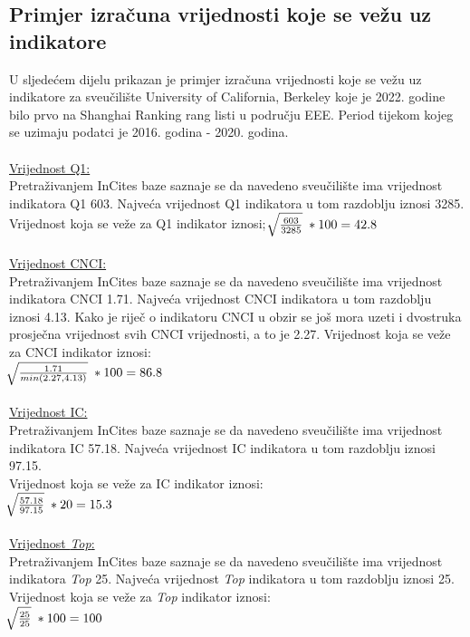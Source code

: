 \documentclass[times, utf8, zavrsni]{fer}
\begin{document}
\subsection{Primjer izračuna vrijednosti koje se vežu uz indikatore}
\label{racunanje}
U sljedećem dijelu prikazan je primjer izračuna vrijednosti koje se vežu uz indikatore za sveučilište University of California, Berkeley koje je 2022. godine bilo prvo na 
Shanghai Ranking rang listi u području EEE.
Period tijekom kojeg se uzimaju podatci je 2016. godina - 2020. godina.
\\
\\ \underline{Vrijednost Q1:} 
\\ Pretraživanjem InCites baze saznaje se da navedeno sveučilište ima vrijednost indikatora Q1 603. Najveća vrijednost Q1 indikatora u tom razdoblju iznosi 3285.
Vrijednost koja se veže za Q1 indikator iznosi;  \; $\sqrt[\leftroot{-2}]{\frac{603}{3285}} \; * 100 = 42.8$
\\
\\ \underline{Vrijednost CNCI:} 
\\ Pretraživanjem InCites baze saznaje se da navedeno sveučilište ima vrijednost indikatora CNCI 1.71. Najveća vrijednost CNCI indikatora u tom razdoblju iznosi 4.13.
Kako je riječ o indikatoru CNCI u obzir se još mora uzeti i dvostruka prosječna vrijednost svih CNCI vrijednosti, a to je 2.27.
Vrijednost koja se veže za CNCI indikator iznosi: \; \\ $\sqrt[\leftroot{-2}]{\frac{1.71}{min(2.27, 4.13)}} \; * 100 = 86.8$
\\
\\ \underline{Vrijednost IC:} 
\\ Pretraživanjem InCites baze saznaje se da navedeno sveučilište ima vrijednost indikatora IC 57.18. Najveća vrijednost IC indikatora u tom razdoblju iznosi 97.15.
\\Vrijednost koja se veže za IC indikator iznosi: \; \\ $\sqrt[\leftroot{-2}]{\frac{57.18}{97.15}} \; * 20 = 15.3$
\\
\\ \underline{Vrijednost \emph{Top}:} 
\\ Pretraživanjem InCites baze saznaje se da navedeno sveučilište ima vrijednost indikatora \emph{Top} 25. Najveća vrijednost \emph{Top} indikatora u tom razdoblju iznosi 25.
Vrijednost koja se veže za \emph{Top} indikator iznosi: \; \\ $\sqrt[\leftroot{-2}]{\frac{25}{25}} \; * 100 = 100$
\\
\end{document}
